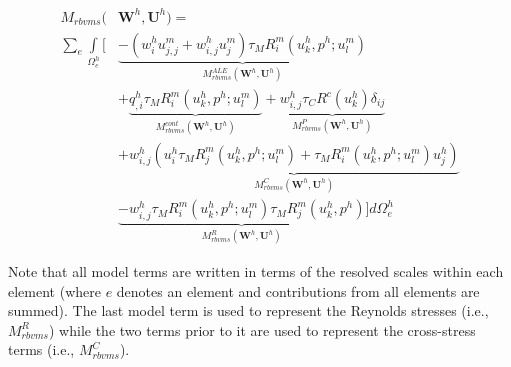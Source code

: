 

\begin{equation}
\label{eq:NS_Mrbvms}
\begin{split}
M_{rbvms}(& \bm{W}^h, \bm{U}^h) = \\
\sum_e \int\limits_{\Omega^h_e} [&\underbrace{-(w^h_i u^m_{j,j}
+ w^h_{i,j} u^m_j ) \tau_M {R}^m_i(u_k^h,p^h;u^m_l)}_{M^{ALE}_{rbvms}(\bm{W}^h,\bm{U}^h)} \\
&+ \underbrace{q^h_{,i} \tau_M {R}^m_i(u_k^h,p^h;u^m_l)}_{M_{rbvms}^{cont}(\bm{W}^h, \bm{U}^h)} + \underbrace{w^h_{i,j}  \tau_C R^c(u^h_k)\delta_{ij}}_{M^P_{rbvms}(\bm{W}^h, \bm{U}^h)} \\
&+\underbrace{w^h_{i,j}\left( u^h_i \tau_M {R}^m_j(u_k^h,p^h;u^m_l) + \tau_M {R}^m_i(u_k^h,p^h;u^m_l) u^h_j \right)}_{M^C_{rbvms}(\bm{W}^h, \bm{U}^h)} \\
&\underbrace{-w^h_{i,j} \tau_M {R}^m_i(u_k^h,p^h;u^m_l) \tau_M {R}^m_j(u_k^h,p^h)}_{M^R_{rbvms}(\bm{W}^h,\bm{U}^h)} ]d\Omega^h_e
\end{split}
\end{equation}



Note that all model terms are written in terms of the resolved scales within
each element (where $e$ denotes an element and contributions from all elements
are summed).
The last model term is used to represent the Reynolds stresses
(i.e., $M^R_{rbvms}$)
while the two terms prior to it are used to represent the cross-stress terms
(i.e., $M^C_{rbvms}$).

